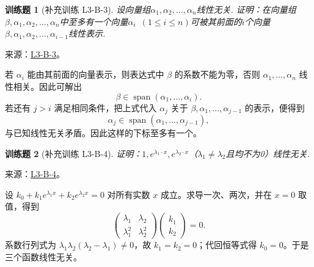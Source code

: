 \documentclass[UTF8,12pt,a4paper,fontset=fandol]{ctexart}
\newtheorem{exercise}{训练题}[section]
\begin{document}
\begin{exercise}[补充训练 L3-B-3]\label{prob:L3-B-3}
设向量组$\alpha_1,\alpha_2,\ldots,\alpha_n$线性无关. 证明：在向量组$\beta,\alpha_1,\alpha_2,\ldots,\alpha_n$中至多有一个向量$\alpha_i\enspace(1 \leqslant i \leqslant n)$可被其前面的$i$个向量$\beta,\alpha_1,\alpha_2,\ldots,\alpha_{i-1}$线性表示.
\end{exercise}
\noindent 来源：\href{https://github.com/yhwu-is/Linear-Algebra-Left-Undone/blob/new/%E8%AE%B2%E4%B9%89/%E4%B8%93%E9%A2%98/3%20%E6%9C%89%E9%99%90%E7%BB%B4%E7%BA%BF%E6%80%A7%E7%A9%BA%E9%97%B4.tex}{L3-B-3}。
\begin{solve}
若 $\alpha_i$ 能由其前面的向量表示，则表达式中 $\beta$ 的系数不能为零，否则 $\alpha_1,\ldots,\alpha_n$ 线性相关。因此可解出
\[\beta\in\operatorname{span}(\alpha_1,\ldots,\alpha_i).\]
若还有 $j>i$ 满足相同条件，把上式代入 $\alpha_j$ 关于 $\beta,\alpha_1,\ldots,\alpha_{j-1}$ 的表示，便得到 \[\alpha_j\in\operatorname{span}(\alpha_1,\ldots,\alpha_{j-1}),\]与已知线性无关矛盾。因此这样的下标至多有一个。
\end{solve}

\begin{exercise}[补充训练 L3-B-4]\label{prob:L3-B-4}
证明：$1,e^{\lambda_1\cdot x},e^{\lambda_2\cdot x}$（$\lambda_1\neq\lambda_2$且均不为0）线性无关.
\end{exercise}
\noindent 来源：\href{https://github.com/yhwu-is/Linear-Algebra-Left-Undone/blob/new/%E8%AE%B2%E4%B9%89/%E4%B8%93%E9%A2%98/3%20%E6%9C%89%E9%99%90%E7%BB%B4%E7%BA%BF%E6%80%A7%E7%A9%BA%E9%97%B4.tex}{L3-B-4}。
\begin{solve}
设 $k_0+k_1e^{\lambda_1x}+k_2e^{\lambda_2x}=0$ 对所有实数 $x$ 成立。求导一次、两次，并在 $x=0$ 取值，得到
\[\begin{pmatrix}\lambda_1&\lambda_2\\\lambda_1^2&\lambda_2^2\end{pmatrix}\begin{pmatrix}k_1\\k_2\end{pmatrix}=0.\]
系数行列式为 $\lambda_1\lambda_2(\lambda_2-\lambda_1)\ne0$，故 $k_1=k_2=0$；代回恒等式得 $k_0=0$。于是三个函数线性无关。
\end{solve}
\end{document}
